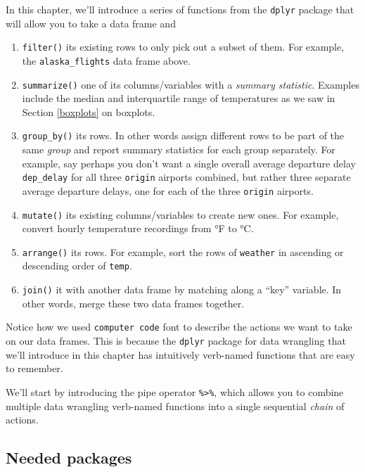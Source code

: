 \documentclass[12pt, krantz2,]{krantz}
\providecommand{\tightlist}{%
  \setlength{\itemsep}{0pt}\setlength{\parskip}{0pt}}
\begin{document}
In this chapter, we'll introduce a series of functions from the \texttt{dplyr} package that will allow you to take a data frame and

\begin{enumerate}
\def\labelenumi{\arabic{enumi}.}
\tightlist
\item
  \texttt{filter()} its existing rows to only pick out a subset of them. For example, the \texttt{alaska\_flights} data frame above.
\item
  \texttt{summarize()} one of its columns/variables with a \emph{summary statistic}. Examples include the median and interquartile range of temperatures as we saw in Section \ref{boxplots} on boxplots.
\item
  \texttt{group\_by()} its rows. In other words assign different rows to be part of the same \emph{group} and report summary statistics for each group separately. For example, say perhaps you don't want a single overall average departure delay \texttt{dep\_delay} for all three \texttt{origin} airports combined, but rather three separate average departure delays, one for each of the three \texttt{origin} airports.
\item
  \texttt{mutate()} its existing columns/variables to create new ones. For example, convert hourly temperature recordings from °F to °C.
\item
  \texttt{arrange()} its rows. For example, sort the rows of \texttt{weather} in ascending or descending order of \texttt{temp}.
\item
  \texttt{join()} it with another data frame by matching along a ``key'' variable. In other words, merge these two data frames together.
\end{enumerate}

Notice how we used \texttt{computer\ code} font to describe the actions we want to take on our data frames. This is because the \texttt{dplyr} package for data wrangling that we'll introduce in this chapter has intuitively verb-named functions that are easy to remember.

We'll start by introducing the pipe operator \texttt{\%\textgreater{}\%}, which allows you to combine multiple data wrangling verb-named functions into a single sequential \emph{chain} of actions.

\hypertarget{needed-packages-1}{%
\subsection*{Needed packages}\label{needed-packages-1}}
\end{document}
